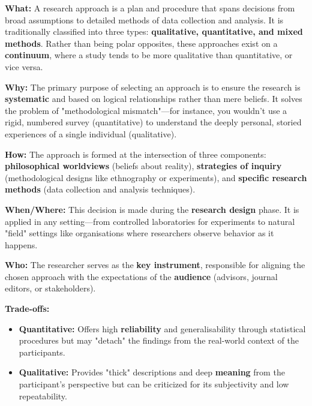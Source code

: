 \documentclass{report}
\begin{document}
\begin{layerReal}
    \textbf{What:} A research approach is a plan and procedure that spans decisions from broad assumptions to detailed methods of data collection and analysis. It is traditionally classified into three types: \textbf{qualitative, quantitative, and mixed methods}. Rather than being polar opposites, these approaches exist on a \textbf{continuum}, where a study tends to be more qualitative than quantitative, or vice versa.
    
    
    \textbf{Why:} The primary purpose of selecting an approach is to ensure the research is \textbf{systematic} and based on logical relationships rather than mere beliefs. It solves the problem of "methodological mismatch"—for instance, you wouldn't use a rigid, numbered survey (quantitative) to understand the deeply personal, storied experiences of a single individual (qualitative).
    
    
    \textbf{How:} The approach is formed at the intersection of three components: \textbf{philosophical worldviews} (beliefs about reality), \textbf{strategies of inquiry} (methodological designs like ethnography or experiments), and \textbf{specific research methods} (data collection and analysis techniques). 
    
    
    \textbf{When/Where:} This decision is made during the \textbf{research design} phase. It is applied in any setting—from controlled laboratories for experiments to natural "field" settings like organisations where researchers observe behavior as it happens.
    
    
    \textbf{Who:} The researcher serves as the \textbf{key instrument}, responsible for aligning the chosen approach with the expectations of the \textbf{audience} (advisors, journal editors, or stakeholders).
    
    
    \textbf{Trade-offs:} 
    \begin{itemize}
        \item \textbf{Quantitative:} Offers high \textbf{reliability} and generalisability through statistical procedures but may "detach" the findings from the real-world context of the participants.
        \item \textbf{Qualitative:} Provides "thick" descriptions and deep \textbf{meaning} from the participant's perspective but can be criticized for its subjectivity and low repeatability.
    \end{itemize}
\end{layerReal}
\end{document}
